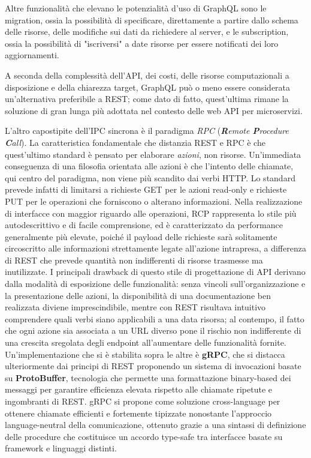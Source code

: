 Altre funzionalità che elevano le potenzialità d'uso di GraphQL sono le migration, ossia la possibilità di specificare, direttamente a partire dallo schema delle risorse, delle modifiche sui dati da richiedere al server, e le subscription, ossia la possibilità di "iscriversi" a date risorse per essere notificati dei loro aggiornamenti.

A seconda della complessità dell'API, dei costi, delle risorse computazionali a disposizione e della chiarezza target, GraphQL può o meno essere considerata un'alternativa preferibile a REST; come dato di fatto, quest'ultima rimane la soluzione di gran lunga più adottata nel contesto delle web API per microservizi.

L'altro capostipite dell'IPC sincrona è il paradigma \emph{RPC} (\emph{\textbf{R}emote \textbf{P}rocedure \textbf{C}all}). La caratteristica fondamentale che distanzia REST e RPC è che quest'ultimo standard è pensato per elaborare \emph{azioni}, non risorse.
Un'immediata conseguenza di una filosofia orientata alle azioni è che l'intento delle chiamate, qui centro del paradigma, non viene più scandito dai verbi HTTP. Lo standard prevede infatti di limitarsi a richieste GET per le azioni read-only e richieste PUT per le operazioni che forniscono o alterano informazioni.
Nella realizzazione di interfacce con maggior riguardo alle operazioni, RCP rappresenta lo stile più autodescrittivo e di facile comprensione, ed è caratterizzato da performance generalmente più elevate, poiché il payload delle richieste sarà solitamente circoscritto alle informazioni strettamente legate all'azione intrapresa, a differenza di REST che prevede quantità non indifferenti di risorse trasmesse ma inutilizzate.
I principali drawback di questo stile di progettazione di API derivano dalla modalità di esposizione delle funzionalità: senza vincoli sull'organizzazione e la presentazione delle azioni, la disponibilità di una documentazione ben realizzata diviene imprescindibile, mentre con REST risultava intuitivo comprendere quali verbi siano applicabili a una data risorsa; al contempo, il fatto che ogni azione sia associata a un URL diverso pone il rischio non indifferente di una crescita sregolata degli endpoint all'aumentare delle funzionalità fornite. Un'implementazione che si è stabilita sopra le altre è \textbf{gRPC}, che si distacca ulteriormente dai principi di REST proponendo un sistema di invocazioni basate su \textbf{ProtoBuffer}, tecnologia che permette una formattazione binary-based dei messaggi per garantire efficienza elevata rispetto alle chiamate ripetute e ingombranti di REST.
gRPC si propone come soluzione cross-language per ottenere chiamate efficienti e fortemente tipizzate nonostante l'approccio language-neutral della comunicazione, ottenuto grazie a una sintassi di definizione delle procedure che costituisce un accordo type-safe tra interfacce basate su framework e linguaggi distinti.


